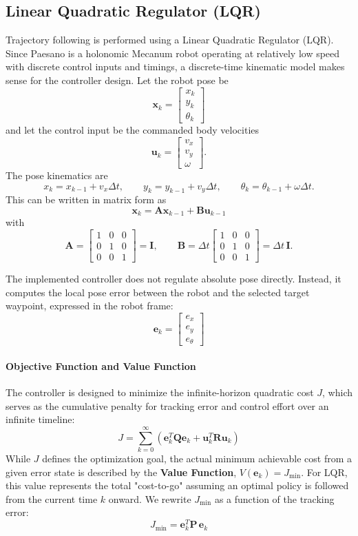 \documentclass[11pt]{article}
\begin{document}
\subsection{Linear Quadratic Regulator (LQR)}
\noindent Trajectory following is performed using a Linear Quadratic Regulator (LQR). Since Paesano is a holonomic
          Mecanum robot operating at relatively low speed with discrete control inputs and timings, a discrete-time kinematic model makes sense for the controller
          design. Let the robot pose be
\[
\mathbf{x}_k =
\begin{bmatrix}
x_k\\
y_k\\
\theta_k
\end{bmatrix}
\]
and let the control input be the commanded body velocities
\[
\mathbf{u}_k =
\begin{bmatrix}
v_x\\
v_y\\
\omega
\end{bmatrix}.
\]
The pose kinematics are
\[
x_k = x_{k-1} + v_x \Delta t,\qquad
y_k = y_{k-1} + v_y \Delta t,\qquad
\theta_k = \theta_{k-1} + \omega \Delta t.
\]
This can be written in matrix form as
\[
\mathbf{x}_k = \mathbf{A}\mathbf{x}_{k-1} + \mathbf{B}\mathbf{u}_{k-1}
\]
with
\[
\mathbf{A} =
\begin{bmatrix}
1 & 0 & 0\\
0 & 1 & 0\\
0 & 0 & 1
\end{bmatrix}
= \mathbf{I},
\qquad
\mathbf{B} =
\Delta t
\begin{bmatrix}
1 & 0 & 0\\
0 & 1 & 0\\
0 & 0 & 1
\end{bmatrix}
= \Delta t\,\mathbf{I}.
\]

\noindent The implemented controller does not regulate absolute pose directly. Instead, it computes the local pose error
          between the robot and the selected target waypoint, expressed in the robot frame:
\[
\mathbf{e}_k =
\begin{bmatrix}
e_x\\
e_y\\
e_\theta
\end{bmatrix}
\]
\paragraph{Objective Function and Value Function}
The controller is designed to minimize the infinite-horizon quadratic cost $J$, which serves as the cumulative penalty
for tracking error and control effort over an infinite timeline:
\[
J = \sum_{k=0}^{\infty} \left( \mathbf{e}_k^T \mathbf{Q}\mathbf{e}_k + \mathbf{u}_k^T \mathbf{R}\mathbf{u}_k \right)
\]
While $J$ defines the optimization goal, the actual minimum achievable cost from a given error state is described by the
\textbf{Value Function}, $V(\mathbf{e}_k) = J_{\min}$. For LQR, this value represents the total
"cost-to-go" assuming an optimal policy is followed from the current time $k$ onward. We rewrite
$J_{\min}$ as a function of the tracking error:
\[
J_{\min} = \mathbf{e}_k^T \mathbf{P}\,\mathbf{e}_k
\]
\end{document}

